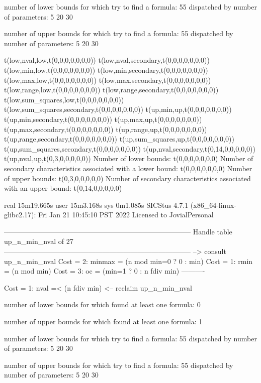 number of lower bounds for which try to find a formula: 55
dispatched by number of parameters: 5  20  30

number of upper bounds for which try to find a formula: 55
dispatched by number of parameters: 5  20  30

t(low,nval,low,t(0,0,0,0,0,0,0))
t(low,nval,secondary,t(0,0,0,0,0,0,0))
t(low,min,low,t(0,0,0,0,0,0,0))
t(low,min,secondary,t(0,0,0,0,0,0,0))
t(low,max,low,t(0,0,0,0,0,0,0))
t(low,max,secondary,t(0,0,0,0,0,0,0))
t(low,range,low,t(0,0,0,0,0,0,0))
t(low,range,secondary,t(0,0,0,0,0,0,0))
t(low,sum_squares,low,t(0,0,0,0,0,0,0))
t(low,sum_squares,secondary,t(0,0,0,0,0,0,0))
t(up,min,up,t(0,0,0,0,0,0,0))
t(up,min,secondary,t(0,0,0,0,0,0,0))
t(up,max,up,t(0,0,0,0,0,0,0))
t(up,max,secondary,t(0,0,0,0,0,0,0))
t(up,range,up,t(0,0,0,0,0,0,0))
t(up,range,secondary,t(0,0,0,0,0,0,0))
t(up,sum_squares,up,t(0,0,0,0,0,0,0))
t(up,sum_squares,secondary,t(0,0,0,0,0,0,0))
t(up,nval,secondary,t(0,14,0,0,0,0,0))
t(up,nval,up,t(0,3,0,0,0,0,0))
Number of lower bounds:                                             t(0,0,0,0,0,0,0)
Number of secondary characteristics associated with a lower bound:  t(0,0,0,0,0,0,0)
Number of upper bounds:                                             t(0,3,0,0,0,0,0)
Number of secondary characteristics associated with an upper bound: t(0,14,0,0,0,0,0)

real	15m19.665s
user	15m3.168s
sys	0m1.085s
SICStus 4.7.1 (x86_64-linux-glibc2.17): Fri Jan 21 10:45:10 PST 2022
Licensed to JovialPersonal


--------------------------------------------------------------------------------
Handle table up_n_min_nval of 27
--------------------------------------------------------------------------------
--> consult up_n_min_nval
Cost =  2:  minmax = (n mod min=0 ? 0 : min)
Cost =  1:  rmin   = (n mod min)
Cost =  3:  oc     = (min=1 ? 0 : n fdiv min)
----------

Cost =  1:  nval =< (n fdiv min)
<-- reclaim up_n_min_nval

number of lower bounds for which found at least one formula: 0

number of upper bounds for which found at least one formula: 1

number of lower bounds for which try to find a formula: 55
dispatched by number of parameters: 5  20  30

number of upper bounds for which try to find a formula: 55
dispatched by number of parameters: 5  20  30

